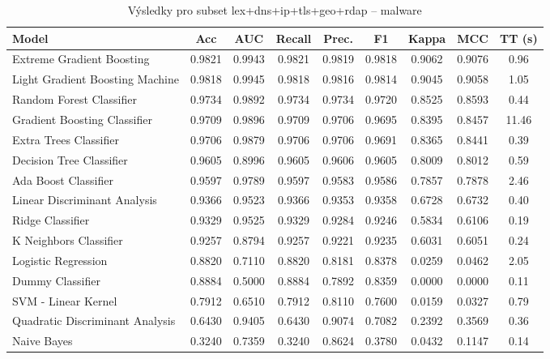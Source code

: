 \begin{table}[H]
  \centering
  \small
  \caption{Výsledky pro subset lex+dns+ip+tls+geo+rdap – malware}
  \begin{tabular}{|l|c|c|c|c|c|c|c|c|}
    \hline
    \textbf{Model} & \textbf{Acc} & \textbf{AUC} & \textbf{Recall} & \textbf{Prec.} & \textbf{F1} & \textbf{Kappa} & \textbf{MCC} & \textbf{TT (s)} \\
    \hline
    Extreme Gradient Boosting & 0.9821 & 0.9943 & 0.9821 & 0.9819 & 0.9818 & 0.9062 & 0.9076 & 0.96 \\
    Light Gradient Boosting Machine & 0.9818 & 0.9945 & 0.9818 & 0.9816 & 0.9814 & 0.9045 & 0.9058 & 1.05 \\
    Random Forest Classifier & 0.9734 & 0.9892 & 0.9734 & 0.9734 & 0.9720 & 0.8525 & 0.8593 & 0.44 \\
    Gradient Boosting Classifier & 0.9709 & 0.9896 & 0.9709 & 0.9706 & 0.9695 & 0.8395 & 0.8457 & 11.46 \\
    Extra Trees Classifier & 0.9706 & 0.9879 & 0.9706 & 0.9706 & 0.9691 & 0.8365 & 0.8441 & 0.39 \\
    Decision Tree Classifier & 0.9605 & 0.8996 & 0.9605 & 0.9606 & 0.9605 & 0.8009 & 0.8012 & 0.59 \\
    Ada Boost Classifier & 0.9597 & 0.9789 & 0.9597 & 0.9583 & 0.9586 & 0.7857 & 0.7878 & 2.46 \\
    Linear Discriminant Analysis & 0.9366 & 0.9523 & 0.9366 & 0.9353 & 0.9358 & 0.6728 & 0.6732 & 0.40 \\
    Ridge Classifier & 0.9329 & 0.9525 & 0.9329 & 0.9284 & 0.9246 & 0.5834 & 0.6106 & 0.19 \\
    K Neighbors Classifier & 0.9257 & 0.8794 & 0.9257 & 0.9221 & 0.9235 & 0.6031 & 0.6051 & 0.24 \\
    Logistic Regression & 0.8820 & 0.7110 & 0.8820 & 0.8181 & 0.8378 & 0.0259 & 0.0462 & 2.05 \\
    Dummy Classifier & 0.8884 & 0.5000 & 0.8884 & 0.7892 & 0.8359 & 0.0000 & 0.0000 & 0.11 \\
    SVM - Linear Kernel & 0.7912 & 0.6510 & 0.7912 & 0.8110 & 0.7600 & 0.0159 & 0.0327 & 0.79 \\
    Quadratic Discriminant Analysis & 0.6430 & 0.9405 & 0.6430 & 0.9074 & 0.7082 & 0.2392 & 0.3569 & 0.36 \\
    Naive Bayes & 0.3240 & 0.7359 & 0.3240 & 0.8624 & 0.3780 & 0.0432 & 0.1147 & 0.14 \\
    \hline
  \end{tabular}
\end{table}
\vspace{0.5cm}

